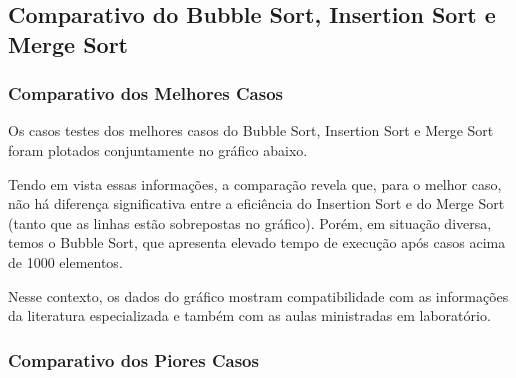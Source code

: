 \documentclass[a4paper, 12pt]{article}
\begin{document}
\vspace{0.8cm}
\subsection{Comparativo do Bubble Sort, Insertion Sort e Merge Sort}
\subsubsection{Comparativo dos Melhores Casos}

\tab{ }Os casos testes dos melhores casos do Bubble Sort, Insertion Sort e Merge Sort foram plotados conjuntamente no gráfico abaixo.
\begin{center}
\end{center}


\vspace{0.8cm}
Tendo em vista essas informações, a comparação revela que, para o melhor caso, não há diferença significativa entre a eficiência do Insertion Sort e do Merge Sort (tanto que as linhas estão sobrepostas no gráfico). Porém, em situação diversa, temos o Bubble Sort, que apresenta elevado tempo de execução após casos acima de 1000 elementos.

Nesse contexto, os dados do gráfico mostram compatibilidade com as informações da literatura especializada e também com as aulas ministradas em laboratório.

\subsubsection{Comparativo dos Piores Casos}
\end{document}
